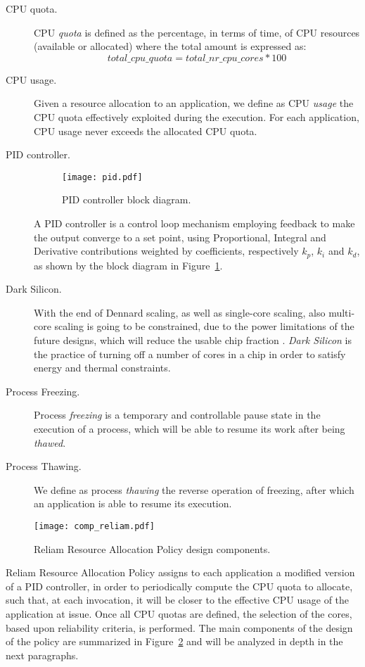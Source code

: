 \begin{description}
\item[CPU quota.]
CPU \emph{quota} is defined as the percentage, in terms of time, of CPU resources (available or allocated) where the total amount is expressed as:
\[total\_cpu\_quota = total\_nr\_cpu\_cores * 100\]
\item[CPU usage.]
Given a resource allocation to an application, we define as CPU \emph{usage} the CPU quota effectively exploited during the execution. For each application, CPU usage never exceeds the allocated CPU quota.
\item[PID controller.]
\begin{figure}[t]
    \centering
    \texttt{[image: pid.pdf]}
    \caption{PID controller block diagram.}
    \label{fig:pid}
\end{figure}
A PID controller is a control loop mechanism employing feedback to make the output converge to a set point, using Proportional, Integral and Derivative contributions weighted by coefficients, respectively $k_{p}$, $k_{i}$ and $k_{d}$, as shown by the block diagram in Figure~\ref{fig:pid}.

\item[Dark Silicon.]
With the end of Dennard scaling, as well as single-core scaling, also multi-core scaling is going to be constrained, due to the power limitations of the future designs, which will reduce the usable chip fraction \cite{10.1145/2024723.2000108}.
\emph{Dark Silicon} is the practice of turning off a number of cores in a chip in order to satisfy energy and thermal constraints. 
\item[Process Freezing.]
Process \emph{freezing} is a temporary and controllable pause state in the execution of a process, which will be able to resume its work after being \emph{thawed}.
\item[Process Thawing.] 
We define as process \emph{thawing} the reverse operation of freezing, after which an application is able to resume its execution.
\end{description}
\begin{figure}[t]
    \centering
    \texttt{[image: comp\_reliam.pdf]}
    \caption{Reliam Resource Allocation Policy design components.}
    \label{fig:reliam_design}
\end{figure}

Reliam Resource Allocation Policy assigns to each application a modified version of a PID controller, in order to periodically compute the CPU quota to allocate, such that, at each invocation, it will be closer to the effective CPU usage of the application at issue. Once all CPU quotas are defined, the selection of the cores, based upon reliability criteria, is performed. The main components of the design of the policy are summarized in Figure~\ref{fig:reliam_design} and will be analyzed in depth in the next paragraphs.

